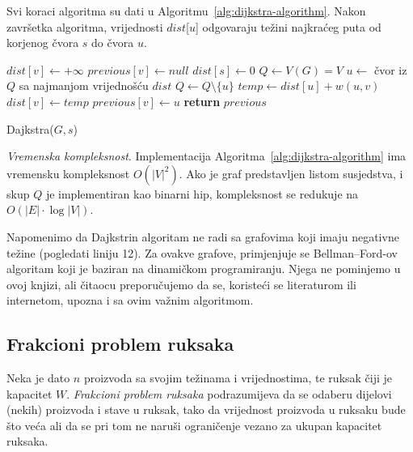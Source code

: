 \documentclass[a4paper, utf8, 11pt, colorlinks]{book}
\theoremstyle{definition}
\begin{document}
Svi koraci algoritma su dati u Algoritmu~\ref{alg:dijkstra-algorithm}. Nakon završetka algoritma, vrijednosti $dist$[$u$] odgovaraju težini najkraćeg puta od korjenog čvora $s$ do čvora $u$. 


\begin{algorithm}[!ht]
	\begin{algorithmic}[1]
	      	\STATE   $dist[v] \gets +\infty$ 	%
		    \STATE $previous[v] \gets null$ 	%
		\ENDFOR
		\STATE	$dist[s] \gets 0$ 	 
		\STATE	$Q \gets V(G)=V$
		\STATE $u \gets$ čvor iz $Q$ sa najmanjom vrijednošću $dist$
		\STATE $Q \gets Q \setminus \{u\}$
		\STATE $temp \gets dist[u] + w(u, v)$
		\STATE  $dist[v] \gets temp$
		\STATE $previous[v] \gets u$ 
		\ENDIF
		\ENDFOR
		\ENDWHILE
		\STATE	\textbf{return} $previous$ 
	\end{algorithmic}
    		\caption{Dajkstra($G,s $)}\label{alg:dijkstra-algorithm}
\end{algorithm}

\emph{Vremenska kompleksnost}.  Implementacija Algoritma~\ref{alg:dijkstra-algorithm} ima vremensku kompleksnost $O(|V|^2)$. Ako je graf predstavljen listom susjedstva, i skup $Q$  je implementiran kao binarni hip, 
kompleksnost se redukuje na $O(|E| \cdot \log |V|)$.

Napomenimo da Dajkstrin algoritam ne radi sa grafovima koji imaju negativne težine (pogledati  liniju 12).  Za ovakve grafove,  primjenjuje se Bellman–Ford-ov algoritam koji je baziran na dinamičkom programiranju. Njega ne pominjemo   u ovoj knjizi, ali čitaocu preporučujemo da se, koristeći se literaturom ili internetom, upozna i sa ovim važnim algoritmom.  %


\subsection{Frakcioni problem ruksaka}\label{sec:frkacruksak}


  Neka je dato $n$ proizvoda sa svojim  težinama i vrijednostima, 
  te ruksak čiji je kapacitet $W$. \emph{Frakcioni problem ruksaka} podrazumijeva da se odaberu dijelovi   (nekih) proizvoda i stave u ruksak, tako da vrijednost proizvoda u ruksaku bude što veća ali da se pri tom ne naruši ograničenje vezano za ukupan kapacitet ruksaka.
\end{document}

